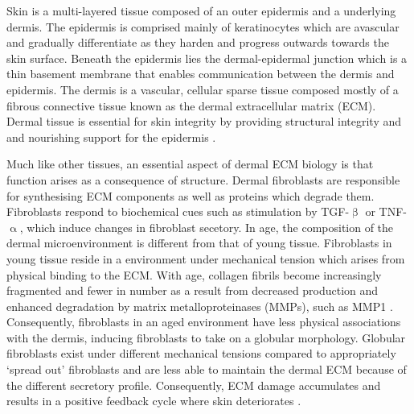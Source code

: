 \documentclass[alpha-refs]{wiley-article}
\newcommand{\tgf}{TGF-$\upbeta$}
\begin{document}
Skin is a multi-layered tissue composed of an outer epidermis and a underlying dermis. The epidermis is comprised mainly of keratinocytes which are avascular and gradually differentiate as they harden and progress outwards towards the skin surface. Beneath the epidermis lies the dermal-epidermal junction which is a thin basement membrane that enables communication between the dermis and epidermis. The dermis is a vascular, cellular sparse tissue composed mostly of a fibrous connective tissue known as the dermal extracellular matrix (ECM). Dermal tissue is essential for skin integrity by providing structural integrity and and nourishing support for the epidermis \citep{Lu2011}. 

Much like other tissues, an essential aspect of dermal ECM biology is that function arises as a consequence of structure. Dermal fibroblasts are responsible for synthesising ECM components as well as proteins which degrade them. Fibroblasts respond to biochemical cues such as stimulation by \tgf{} or TNF-$\upalpha$, which induce changes in fibroblast secetory. In age, the composition of the dermal microenvironment is different from that of young tissue. Fibroblasts in young tissue reside in a environment under mechanical tension which arises from physical binding to the ECM. With age, collagen fibrils become increasingly fragmented and fewer in number as a result from decreased production and enhanced degradation by matrix metalloproteinases (MMPs), such as MMP1 \citep{Fisher2008, Quan2015, Fisher2009, Varani2006}. Consequently, fibroblasts in an aged environment have less physical associations with the dermis, inducing fibroblasts to take on a globular morphology. Globular fibroblasts exist under different mechanical tensions compared to appropriately `spread out' fibroblasts and are less able to maintain the dermal ECM because of the different secretory profile. Consequently, ECM damage accumulates and results in a positive feedback cycle where skin deteriorates \citep{Fisher2008, Cole2018, Quan2015, Fisher2009, Varani2006}.
%
\end{document}
